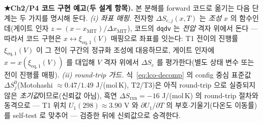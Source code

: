 \documentclass[11pt,a4paper]{article}
\newcommand{\eq}{\mathrm{eq}}
\newcommand{\rxn}{\mathrm{rxn}}
\newcommand{\code}[1]{\texttt{#1}}
\begin{document}
\textbf{★Ch2/P4 코드 구현 예고(두 설계 항목).} 본 분해를 forward 코드로 옮기는 다음 단계는 두 가지를 명시해 둔다.
\emph{(i) 좌표 매핑.} 전자항 $\Delta S_{e,j}(x,T)$ 는 \emph{조성} $x$ 의 함수인데(게이트 인자
$z=(x-x_\mathrm{MIT})/\Delta x_\mathrm{MIT}$), 코드의 \code{dqdv} 는 \emph{전압} 격자 위에서 돈다 — 따라서 코드 구현은
$x\!\leftrightarrow\!\xi_{\eq,1}(V)$ 매핑으로 좌표를 잇는다: T1 전이의 진행률 $\xi_{\eq,1}(V)$ 이 그 전이 구간의 정규화
조성에 대응하므로, 게이트 인자에 $x=x(\xi_{\eq,1}(V))$ 를 대입해 $V$ 격자 위에서 $\Delta S_e$ 를 평가한다(별도 상태
변수 또는 전이 진행률 매핑). \emph{(ii) round-trip 가드.} 식~\eqref{eq:lco-decomp} 의 config 중심 표준값
$\Delta S_j^0$(Motohashi\cite{motohashi2009} $\approx0.47/1.49$ J/(mol\,K), T2/T3)은 아직 round-trip 으로 실증되지 않은
\emph{초기값}이므로(신뢰값 아님), 흑연 $\Delta S_\rxn{=}-16$ J/(mol\,K) 의 round-trip 절차와 동격으로 — T1 위치
$U_1(298)\approx3.90$ V 와 $\partial U_1/\partial T$ 의 부호$\cdot$기울기(다온도 이동률)를 self-test 로 맞추어 — 검증한 뒤에
신뢰값으로 승격한다.
\end{document}
